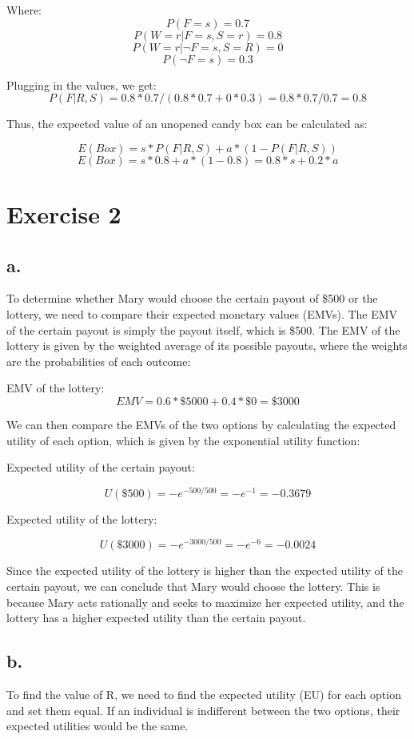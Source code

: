 \documentclass{article}
\begin{document}
Where:
\[P(F = s) = 0.7\]
\[P(W = r|F = s, S = r) = 0.8\]
\[P(W = r|\neg F = s, S = R) = 0\]
\[P(\neg F = s) = 0.3\]

Plugging in the values, we get:
\[P(F|R,S) = 0.8 * 0.7 / (0.8 * 0.7 + 0 * 0.3) = 0.8 * 0.7 / 0.7 = 0.8\]

Thus, the expected value of an unopened candy box can be calculated as:

\[E(Box) = s * P(F|R,S) + a * (1 - P(F|R,S))\]
\[E(Box) = s * 0.8 + a * (1 - 0.8) = 0.8 * s + 0.2 * a\]

\section*{Exercise 2}

\subsection*{a.}

To determine whether Mary would choose the certain payout of \$500 or the lottery, we need to compare their expected monetary values (EMVs). The EMV of the certain payout is simply the payout itself, which is \$500. The EMV of the lottery is given by the weighted average of its possible payouts, where the weights are the probabilities of each outcome:

EMV of the lottery:
\[EMV = 0.6 * \$5000 + 0.4 * \$0 = \$3000\]

We can then compare the EMVs of the two options by calculating the expected utility of each option, which is given by the exponential utility function:

Expected utility of the certain payout: 

\[U(\$500) = -e^{-500/500} = -e^{-1} = -0.3679\]

Expected utility of the lottery: 

\[U(\$3000) = -e^{-3000/500} = -e^{-6} = -0.0024\]

Since the expected utility of the lottery is higher than the expected utility of the certain payout, we can conclude that Mary would choose the lottery. This is because Mary acts rationally and seeks to maximize her expected utility, and the lottery has a higher expected utility than the certain payout.

\subsection*{b.}

To find the value of R, we need to find the expected utility (EU) for each option and set them equal. If an individual is indifferent between the two options, their expected utilities would be the same.
\end{document}
